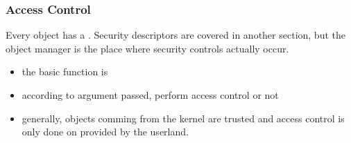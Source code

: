 
\begin{frame}
  \frametitle{Access Control}

  Every object has a . Security descriptors are covered in
  another section, but the object manager is the place where security controls actually
  occur.

  \begin{itemize}
    \item
      the basic function is 
    \item
      according to argument passed, perform access control or not
   \item
     generally, objects comming from the kernel are trusted and access control
     is only done on  provided by the userland.
  \end{itemize}
\end{frame}


